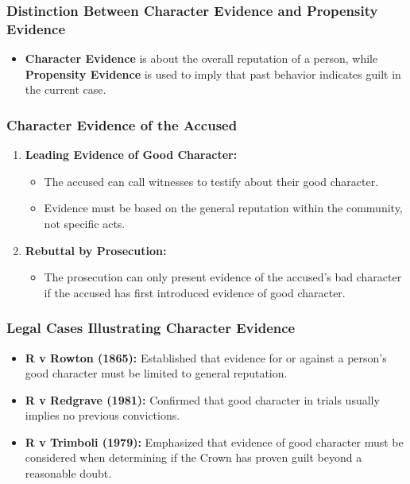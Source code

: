 \subsubsection{Distinction Between Character Evidence and Propensity
Evidence}\label{distinction-between-character-evidence-and-propensity-evidence}

\begin{itemize}
\tightlist
\item
  \textbf{Character Evidence} is about the overall reputation of a
  person, while \textbf{Propensity Evidence} is used to imply that past
  behavior indicates guilt in the current case.
\end{itemize}

\subsubsection{Character Evidence of the
Accused}\label{character-evidence-of-the-accused}

\begin{enumerate}
\def\labelenumi{\arabic{enumi}.}
\tightlist
\item
  \textbf{Leading Evidence of Good Character:}

  \begin{itemize}
  \tightlist
  \item
    The accused can call witnesses to testify about their good
    character.
  \item
    Evidence must be based on the general reputation within the
    community, not specific acts.
  \end{itemize}
\item
  \textbf{Rebuttal by Prosecution:}

  \begin{itemize}
  \tightlist
  \item
    The prosecution can only present evidence of the accused's bad
    character if the accused has first introduced evidence of good
    character.
  \end{itemize}
\end{enumerate}

\subsubsection{Legal Cases Illustrating Character
Evidence}\label{legal-cases-illustrating-character-evidence}

\begin{itemize}
\item
  \textbf{R v Rowton (1865):} Established that evidence for or against a
  person's good character must be limited to general reputation.
\item
  \textbf{R v Redgrave (1981):} Confirmed that good character in trials
  usually implies no previous convictions.
\item
  \textbf{R v Trimboli (1979):} Emphasized that evidence of good
  character must be considered when determining if the Crown has proven
  guilt beyond a reasonable doubt.
\end{itemize}


